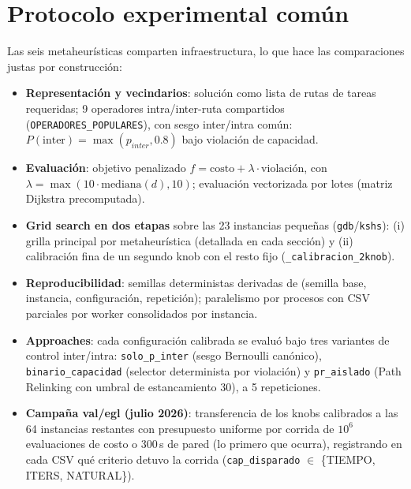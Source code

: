 
\section*{Protocolo experimental común}

Las seis metaheurísticas comparten infraestructura, lo que hace las
comparaciones justas por construcción:

\begin{itemize}
  \item \textbf{Representación y vecindarios}: solución como lista de rutas de
    tareas requeridas; 9 operadores intra/inter-ruta compartidos
    (\texttt{OPERADORES\_POPULARES}), con sesgo inter/intra común:
    $P(\text{inter}) = \max(p_{inter}, 0.8)$ bajo violación de capacidad.
  \item \textbf{Evaluación}: objetivo penalizado $f = \text{costo} + \lambda
    \cdot \text{violación}$, con $\lambda = \max(10 \cdot \text{mediana}(d),
    10)$; evaluación vectorizada por lotes (matriz Dijkstra precomputada).
  \item \textbf{Grid search en dos etapas} sobre las 23 instancias pequeñas
    (\texttt{gdb}/\texttt{kshs}): (i) grilla principal por metaheurística
    (detallada en cada sección) y (ii) calibración fina de un segundo knob
    con el resto fijo (\texttt{\_calibracion\_2knob}).
  \item \textbf{Reproducibilidad}: semillas deterministas derivadas de
    (semilla base, instancia, configuración, repetición); paralelismo por
    procesos con CSV parciales por worker consolidados por instancia.
  \item \textbf{Approaches}: cada configuración calibrada se evaluó bajo tres
    variantes de control inter/intra: \texttt{solo\_p\_inter} (sesgo
    Bernoulli canónico), \texttt{binario\_capacidad} (selector determinista
    por violación) y \texttt{pr\_aislado} (Path Relinking con umbral de
    estancamiento 30), a 5 repeticiones.
  \item \textbf{Campaña val/egl (julio 2026)}: transferencia de los knobs
    calibrados a las 64 instancias restantes con presupuesto uniforme por
    corrida de $10^6$ evaluaciones de costo o 300\,s de pared (lo primero que
    ocurra), registrando en cada CSV qué criterio detuvo la corrida
    (\texttt{cap\_disparado} $\in$ \{TIEMPO, ITERS, NATURAL\}).
\end{itemize}







